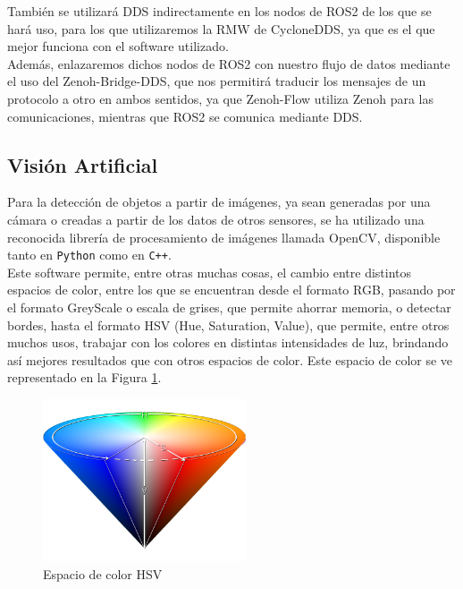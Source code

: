 También se utilizará DDS indirectamente en los nodos de ROS2 de los que se hará
uso, para los que utilizaremos la RMW de CycloneDDS, ya que es el que mejor
funciona con el software utilizado.
\\

Además, enlazaremos dichos nodos de ROS2 con nuestro flujo de datos mediante el
uso del Zenoh-Bridge-DDS, que nos permitirá traducir los mensajes de un
protocolo a otro en ambos sentidos, ya que Zenoh-Flow utiliza Zenoh para las
comunicaciones, mientras que ROS2 se comunica mediante DDS.
\\


\subsection{Visión Artificial}
\label{sec:vision_artificial}

Para la detección de objetos a partir de imágenes, ya sean generadas por una
cámara o creadas a partir de los datos de otros sensores, se ha utilizado una
reconocida librería de procesamiento de imágenes llamada OpenCV, disponible
tanto en \texttt{Python} como en \texttt{C++}.
\\

Este software permite, entre otras muchas cosas, el cambio entre distintos
espacios de color, entre los que se encuentran desde el formato RGB, pasando
por el formato GreyScale o escala de grises, que permite ahorrar memoria, o
detectar bordes, hasta el formato HSV (Hue, Saturation, Value), que permite,
entre otros muchos usos, trabajar con los colores en distintas intensidades de
luz, brindando así mejores resultados que con otros espacios de color.
Este espacio de color se ve representado en la Figura \ref{fig:hsv}.
\\

\begin{figure} [h!]
  \begin{center}
    \includegraphics[width=6cm]{figs/hsv_cone}
  \end{center}
  \caption{Espacio de color HSV \cite{hsv_cone}}
  \label{fig:hsv}
\end{figure}\

